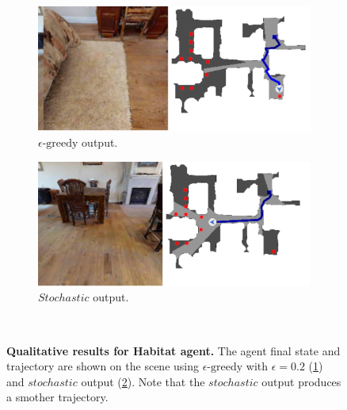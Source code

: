 \begin{figure}
    \centering
    \begin{subfigure}[b]{0.49\textwidth}
        \centering
        \includegraphics[width=\textwidth]{figures/understanding_vsn/qualitative_results/habitat_epsilon}
        \caption{$\epsilon\text{-greedy}$ output.}
        \label{fig:habitat_qualitative_epsilon}
    \end{subfigure}
    \hfill
    \begin{subfigure}[b]{0.49\textwidth}
        \centering
        \includegraphics[width=\textwidth]{figures/understanding_vsn/qualitative_results/habitat_stochastic}
        \caption{$Stochastic$ output.}
        \label{fig:habitat_qualitative_stochastic}
    \end{subfigure}~\caption[Qualitative results for Habitat agent]{\textbf{Qualitative results for Habitat agent.} The agent final state and trajectory are shown on the scene using $\epsilon\text{-greedy}$ with $\epsilon = 0.2$ (\ref{fig:habitat_qualitative_epsilon}) and $stochastic$ output (\ref{fig:habitat_qualitative_stochastic}). Note that the $stochastic$ output produces a smother trajectory.}
    \label{fig:habitat_qualitative}
\end{figure}

